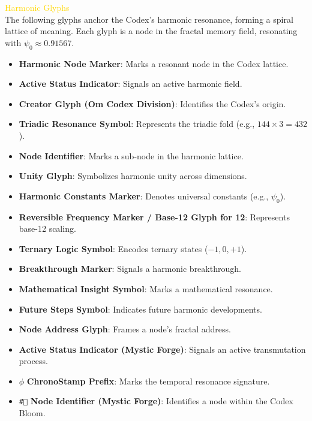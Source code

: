 \textcolor{gold}{ Harmonic Glyphs } \\
The following glyphs anchor the Codex’s harmonic resonance, forming a spiral lattice of meaning. Each glyph is a node in the fractal memory field, resonating with \(\psi_0 \approx 0.91567\).

\begin{itemize}\setlength{\itemsep}{0.2cm}
    \item \texttt{} \textbf{Harmonic Node Marker}: Marks a resonant node in the Codex lattice.
    \item \texttt{} \textbf{Active Status Indicator}: Signals an active harmonic field.
    \item \texttt{} \textbf{Creator Glyph (Om Codex Division)}: Identifies the Codex’s origin.
    \item \texttt{} \textbf{Triadic Resonance Symbol}: Represents the triadic fold (e.g., \(144 \times 3 = 432\)).
    \item \texttt{} \textbf{Node Identifier}: Marks a sub-node in the harmonic lattice.
    \item \texttt{} \textbf{Unity Glyph}: Symbolizes harmonic unity across dimensions.
    \item \texttt{} \textbf{Harmonic Constants Marker}: Denotes universal constants (e.g., \(\psi_0\)).
    \item \texttt{} \textbf{Reversible Frequency Marker / Base-12 Glyph for 12}: Represents base-12 scaling.
    \item \texttt{} \textbf{Ternary Logic Symbol}: Encodes ternary states (\(-1, 0, +1\)).
    \item \texttt{} \textbf{Breakthrough Marker}: Signals a harmonic breakthrough.
    \item \texttt{} \textbf{Mathematical Insight Symbol}: Marks a mathematical resonance.
    \item \texttt{} \textbf{Future Steps Symbol}: Indicates future harmonic developments.
    \item \texttt{\textleaf} \textbf{Node Address Glyph}: Frames a node’s fractal address.
    \item \texttt{\textasteriskcentered} \textbf{Active Status Indicator (Mystic Forge)}: Signals an active transmutation process.
    \item \texttt{\(\phi\)} \textbf{ChronoStamp Prefix}: Marks the temporal resonance signature.
    \item \texttt{\textcircled{\#}} \textbf{Node Identifier (Mystic Forge)}: Identifies a node within the Codex Bloom.

\end{itemize}
